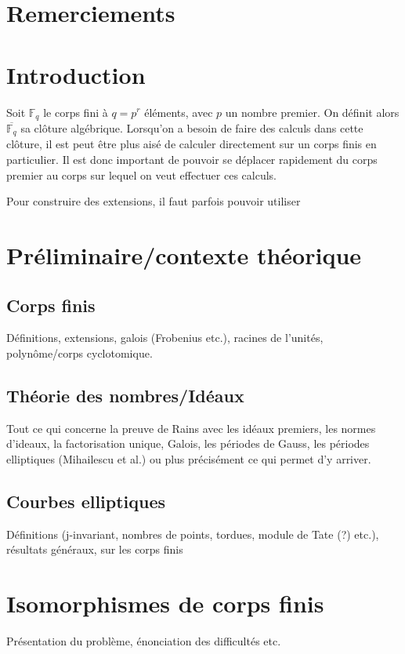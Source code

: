 \documentclass[a4paper]{article} %
\numberwithin{equation}{section}
\newcommand\GF[1]{\mathbb{F}_{#1}}
\begin{document}
\newtheorem{thm}{Thèorème}[section]
\newtheorem{lem}[thm]{Lemme}
\newtheorem{cor}{Corollaire}[thm]
\newtheorem{prop}[thm]{Proposition}
\theoremstyle{definition}
\newtheorem{defn}[thm]{Définition}
\newtheorem*{ex}{Exemple}
\theoremstyle{remark}
\newtheorem{rem}{Remarque}[thm]
\section*{Remerciements}
\section*{Introduction}
Soit $\GF{q}$ le corps fini à $q = p^r$ éléments, avec $p$ un nombre premier. On
définit alors $\overline{\GF{q}}$ sa clôture algébrique. Lorsqu'on a besoin de
faire des calculs dans cette clôture, il est peut être plus aisé de calculer
directement sur un corps finis en particulier. Il est donc important de pouvoir
se déplacer rapidement du corps premier au corps sur lequel on veut effectuer
ces calculs.\par
Pour construire des extensions, il faut parfois pouvoir utiliser

\section{Préliminaire/contexte théorique}
\subsection{Corps finis}
Définitions, extensions, galois (Frobenius etc.), racines de l'unités, 
polynôme/corps cyclotomique.
\subsection{Théorie des nombres/Idéaux}
Tout ce qui concerne la preuve de Rains avec les idéaux premiers, les normes
 d'ideaux, la factorisation unique, Galois, les périodes de Gauss, les 
 périodes elliptiques (Mihailescu et al.) ou plus précisément ce qui permet 
 d'y arriver.
\subsection{Courbes elliptiques}
Définitions (j-invariant, nombres de points, tordues, module de Tate (?) 
etc.), résultats généraux, sur les corps finis


\section{Isomorphismes de corps finis}
Présentation du problème, énonciation des difficultés etc.
\end{document}
